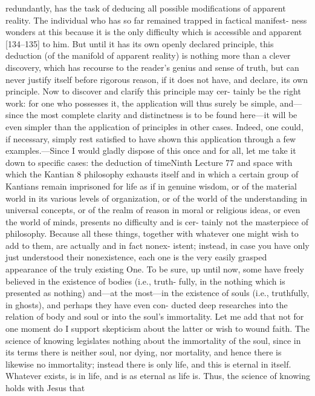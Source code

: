 redundantly, has the task of deducing all possible modifications of apparent
reality. The individual who has so far remained trapped in factical manifest-
ness wonders at this because it is the only difficulty which is accessible and
apparent [134–135] to him. But until it has its own openly declared principle,
this deduction (of the manifold of apparent reality) is nothing more than a
clever discovery, which has recourse to the reader’s genius and sense of truth,
but can never justify itself before rigorous reason, if it does not have, and
declare, its own principle. Now to discover and clarify this principle may cer-
tainly be the right work: for one who possesses it, the application will thus
surely be simple, and—since the most complete clarity and distinctness is to
be found here—it will be even simpler than the application of principles in
other cases. Indeed, one could, if necessary, simply rest satisfied to have shown
this application through a few examples.—Since I would gladly dispose of this
once and for all, let me take it down to specific cases: the deduction of timeNinth Lecture
77
and space with which the Kantian 8 philosophy exhausts itself and in which a
certain group of Kantians remain imprisoned for life as if in genuine wisdom,
or of the material world in its various levels of organization, or of the world
of the understanding in universal concepts, or of the realm of reason in moral
or religious ideas, or even the world of minds, presents no difficulty and is cer-
tainly not the masterpiece of philosophy. Because all these things, together
with whatever one might wish to add to them, are actually and in fact nonex-
istent; instead, in case you have only just understood their nonexistence, each
one is the very easily grasped appearance of the truly existing One. To be sure,
up until now, some have freely believed in the existence of bodies (i.e., truth-
fully, in the nothing which is presented as nothing) and—at the most—in the
existence of souls (i.e., truthfully, in ghosts), and perhaps they have even con-
ducted deep researches into the relation of body and soul or into the soul’s
immortality. Let me add that not for one moment do I support skepticism
about the latter or wish to wound faith. The science of knowing legislates
nothing about the immortality of the soul, since in its terms there is neither
soul, nor dying, nor mortality, and hence there is likewise no immortality;
instead there is only life, and this is eternal in itself. Whatever exists, is in life,
and is as eternal as life is. Thus, the science of knowing holds with Jesus that
